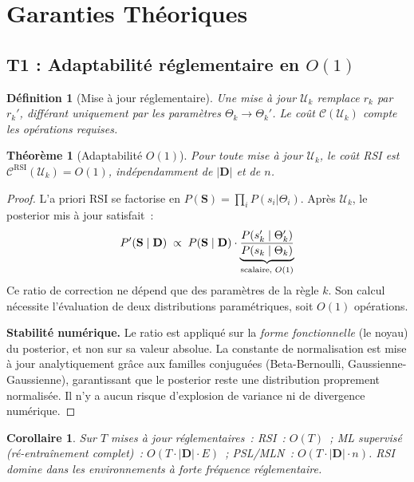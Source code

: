 \documentclass[letterpaper]{article}
\newtheorem{theoreme}{Th\'eor\`eme}
\newtheorem{corollaire}{Corollaire}[theoreme]
\newtheorem{definition}{D\'efinition}
\begin{document}
\section{Garanties Th\'eoriques}
\label{sec:theory}

\subsection{T1 : Adaptabilit\'e r\'eglementaire en $O(1)$}

\begin{definition}[Mise \`a jour r\'eglementaire]
Une mise \`a jour $\mathcal{U}_k$ remplace $r_k$ par $r_k'$, diff\'erant
uniquement par les param\`etres $\Theta_k \to \Theta_k'$.
Le co\^ut $\mathcal{C}(\mathcal{U}_k)$ compte les op\'erations requises.
\end{definition}

\begin{theoreme}[Adaptabilit\'e $O(1)$]
\label{thm:o1}
Pour toute mise \`a jour $\mathcal{U}_k$, le co\^ut RSI est
$\mathcal{C}^{\mathrm{RSI}}(\mathcal{U}_k) = O(1)$, ind\'ependamment
de $|\mathbf{D}|$ et de $n$.
\end{theoreme}

\begin{proof}
L'a priori RSI se factorise en $P(\mathbf{S}) = \prod_i P(s_i | \Theta_i)$.
Apr\`es $\mathcal{U}_k$, le posterior mis \`a jour satisfait~:
\[
  P'(\mathbf{S} \mid \mathbf{D}) \;\propto\; P(\mathbf{S} \mid \mathbf{D})
  \cdot \underbrace{\frac{P(s_k' \mid \Theta_k')}{P(s_k \mid \Theta_k)}}_{%
    \text{scalaire, } O(1)}
\]
Ce ratio de correction ne d\'epend que des param\`etres de la r\`egle $k$.
Son calcul n\'ecessite l'\'evaluation de deux distributions
param\'etriques, soit $O(1)$ op\'erations.

\noindent\textbf{Stabilit\'e num\'erique.} Le ratio est appliqu\'e sur
la \emph{forme fonctionnelle} (le noyau) du posterior, et non sur sa
valeur absolue. La constante de normalisation est mise \`a jour
analytiquement gr\^ace aux familles conjugu\'ees (Beta-Bernoulli,
Gaussienne-Gaussienne), garantissant que le posterior reste une
distribution proprement normalis\'ee. Il n'y a aucun risque d'explosion
de variance ni de divergence num\'erique.
\end{proof}

\begin{corollaire}
Sur $T$ mises \`a jour r\'eglementaires~:
RSI~: $O(T)$~;
ML supervis\'e (r\'e-entra\^inement complet)~: $O(T \cdot |\mathbf{D}| \cdot E)$~;
PSL/MLN~: $O(T \cdot |\mathbf{D}| \cdot n)$.
RSI domine dans les environnements \`a forte fr\'equence r\'eglementaire.
\end{corollaire}
\end{document}
